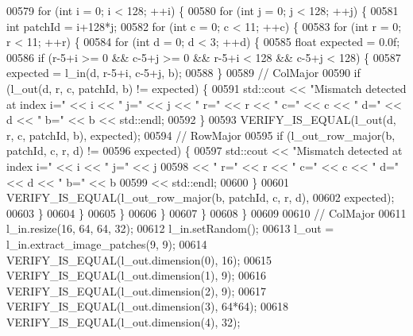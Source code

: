 \begin{DoxyCode}
00579     \textcolor{keywordflow}{for} (\textcolor{keywordtype}{int} i = 0; i < 128; ++i) \{
00580       \textcolor{keywordflow}{for} (\textcolor{keywordtype}{int} j = 0; j < 128; ++j) \{
00581         \textcolor{keywordtype}{int} patchId = i+128*j;
00582         \textcolor{keywordflow}{for} (\textcolor{keywordtype}{int} c = 0; c < 11; ++c) \{
00583           \textcolor{keywordflow}{for} (\textcolor{keywordtype}{int} r = 0; r < 11; ++r) \{
00584             \textcolor{keywordflow}{for} (\textcolor{keywordtype}{int} d = 0; d < 3; ++d) \{
00585               \textcolor{keywordtype}{float} expected = 0.0f;
00586               \textcolor{keywordflow}{if} (r-5+i >= 0 && c-5+j >= 0 && r-5+i < 128 && c-5+j < 128) \{
00587                 expected = l\_in(d, r-5+i, c-5+j, b);
00588               \}
00589               \textcolor{comment}{// ColMajor}
00590               \textcolor{keywordflow}{if} (l\_out(d, r, c, patchId, b) != expected) \{
00591                 std::cout << \textcolor{stringliteral}{"Mismatch detected at index i="} << i << \textcolor{stringliteral}{" j="} << j << \textcolor{stringliteral}{" r="} << r << \textcolor{stringliteral}{" c="} << c
       << \textcolor{stringliteral}{" d="} << d << \textcolor{stringliteral}{" b="} << b << std::endl;
00592               \}
00593               VERIFY\_IS\_EQUAL(l\_out(d, r, c, patchId, b), expected);
00594               \textcolor{comment}{// RowMajor}
00595               \textcolor{keywordflow}{if} (l\_out\_row\_major(b, patchId, c, r, d) !=
00596                   expected) \{
00597                 std::cout << \textcolor{stringliteral}{"Mismatch detected at index i="} << i << \textcolor{stringliteral}{" j="} << j
00598                      << \textcolor{stringliteral}{" r="} << r << \textcolor{stringliteral}{" c="} << c << \textcolor{stringliteral}{" d="} << d << \textcolor{stringliteral}{" b="} << b
00599                      << std::endl;
00600               \}
00601               VERIFY\_IS\_EQUAL(l\_out\_row\_major(b, patchId, c, r, d),
00602                               expected);
00603             \}
00604           \}
00605         \}
00606       \}
00607     \}
00608   \}
00609 
00610   \textcolor{comment}{// ColMajor}
00611   l\_in.resize(16, 64, 64, 32);
00612   l\_in.setRandom();
00613   l\_out = l\_in.extract\_image\_patches(9, 9);
00614   VERIFY\_IS\_EQUAL(l\_out.dimension(0), 16);
00615   VERIFY\_IS\_EQUAL(l\_out.dimension(1), 9);
00616   VERIFY\_IS\_EQUAL(l\_out.dimension(2), 9);
00617   VERIFY\_IS\_EQUAL(l\_out.dimension(3), 64*64);
00618   VERIFY\_IS\_EQUAL(l\_out.dimension(4), 32);

\end{DoxyCode}
